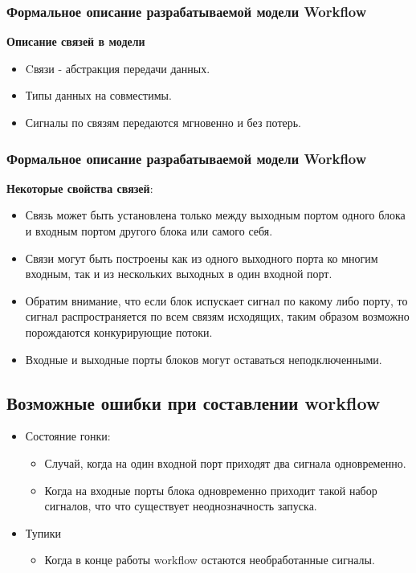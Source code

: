 \documentclass[10pt,pdf,hyperref={unicode}]{beamer}
\begin{document}
\begin{frame}
\frametitle{Формальное описание разрабатываемой модели Workflow}
\textbf{Описание связей в модели}
\begin{itemize}
\item<1-> Cвязи - абстракция передачи данных.
\item<1-> Типы данных на совместимы.
\item<1-> Сигналы по связям передаются мгновенно и без потерь.
\end{itemize} 

\end{frame}

\begin{frame}
\frametitle{Формальное описание разрабатываемой модели Workflow}
\textbf{Некоторые свойства связей}:
\begin{itemize}
\item<1-> Связь может быть установлена только между выходным портом одного блока и входным портом другого блока или самого себя.
\item<1-> Связи могут быть построены как из одного выходного порта ко многим входным, так и из нескольких выходных в один входной порт.
\item<1->Обратим внимание, что если блок испускает сигнал по какому либо порту, то сигнал распространяется по всем связям исходящих, таким образом возможно порождаются конкурирующие потоки.
\item<1-> Входные и выходные порты блоков могут оставаться неподключенными.
\end{itemize} 
\end{frame}



\begin{frame}
\subsection{Возможные ошибки при составлении workflow}
\begin{itemize}
\item<1-> 
Состояние гонки:
\begin{itemize}
\item<1-> Случай, когда на один входной порт приходят два сигнала одновременно.
\item<1-> Когда на входные порты блока одновременно приходит такой набор сигналов, что что существует неоднозначность запуска.
\end{itemize}

\item<1-> Тупики
\begin{itemize}
\item<1-> Когда в конце работы workflow остаются необработанные сигналы.
\end{itemize}
\end{itemize}
\end{frame}
\end{document}
